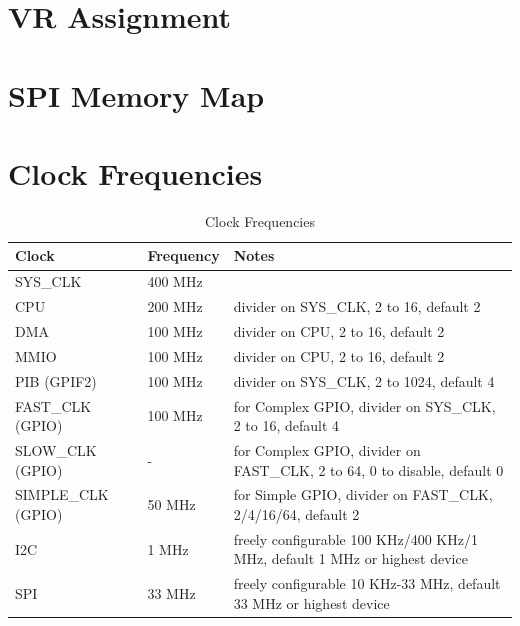 \documentclass[a4paper,12pt]{report}
\begin{document}


\chapter{VR Assignment} \label{chap:appendix_vr_assignment}



\chapter{SPI Memory Map} \label{chap:appendix_spi_memory_map}



\chapter{Clock Frequencies} \label{chap:appendix_clock_frequencies}

\begin{table}[H]
\begin{center}
\caption{Clock Frequencies}
\label{tab:clock_frequencies}
\begin{tabu} to \linewidth {|l|l|X|}
\hline
Clock & Frequency & Notes \\ \hline
SYS\_CLK & 400 MHz &  \\ \hline
CPU & 200 MHz & divider on SYS\_CLK, 2 to 16, default 2 \\ \hline
DMA & 100 MHz & divider on CPU, 2 to 16, default 2 \\ \hline
MMIO & 100 MHz & divider on CPU, 2 to 16, default 2 \\ \hline
PIB (GPIF2) & 100 MHz & divider on SYS\_CLK, 2 to 1024, default 4 \\ \hline
FAST\_CLK (GPIO) & 100 MHz & for Complex GPIO, divider on SYS\_CLK, 2 to 16, default 4 \\ \hline
SLOW\_CLK (GPIO) & - & for Complex GPIO, divider on FAST\_CLK, 2 to 64, 0 to disable, default 0 \\ \hline
SIMPLE\_CLK (GPIO) & 50 MHz & for Simple GPIO, divider on FAST\_CLK, 2/4/16/64, default 2 \\ \hline
I2C & 1 MHz & freely configurable 100 KHz/400 KHz/1 MHz, default 1 MHz or highest device \\ \hline
SPI & 33 MHz & freely configurable 10 KHz-33 MHz, default 33 MHz or highest device \\ \hline
\end{tabu}
\end{center}
\end{table}
\end{document}
